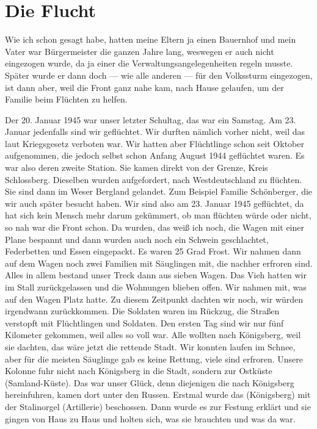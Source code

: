 \documentclass[12pt, twoside]{book}
\begin{document}
\chapter{Die Flucht}

Wie ich schon gesagt habe, hatten meine Eltern ja einen Bauernhof und mein Vater war Bürgermeister die ganzen Jahre lang, weswegen er auch nicht eingezogen wurde, da ja einer die Verwaltungsangelegenheiten regeln musste.
Später wurde er dann doch --- wie alle anderen --- für den Volkssturm eingezogen, ist dann aber, weil die Front ganz nahe kam, nach Hause gelaufen, um der Familie beim Flüchten zu helfen. 

Der 20. Januar 1945 war unser letzter Schultag, das war ein Samstag. Am 23. Januar jedenfalls sind wir geflüchtet. Wir durften nämlich vorher nicht, weil das laut Kriegsgesetz verboten war.
Wir hatten aber Flüchtlinge schon seit Oktober aufgenommen, die jedoch selbst schon Anfang August 1944 geflüchtet waren. Es war also deren zweite Station. Sie kamen direkt von der Grenze, Kreis Schlossberg.
Dieselben wurden aufgefordert, nach Westdeutschland zu flüchten. Sie sind dann im Weser Bergland gelandet. Zum Beispiel Familie Schönberger, die wir auch später besucht haben. Wir sind also am 23. Januar 1945
geflüchtet, da hat sich kein Mensch mehr darum gekümmert, ob man flüchten würde oder nicht, so nah war die Front schon. Da wurden, das weiß ich noch, die Wagen mit einer Plane bespannt und dann wurden 
auch noch ein Schwein geschlachtet, Federbetten und Essen eingepackt. Es waren 25 Grad Frost. Wir nahmen dann auf dem Wagen noch zwei Familien mit Säuglingen mit, die nachher erfroren sind.
Alles in allem bestand unser Treck dann aus sieben Wagen. Das Vieh hatten wir im Stall zurückgelassen und die Wohnungen blieben offen. Wir nahmen mit, was auf den Wagen Platz hatte. Zu diesem Zeitpunkt dachten
wir noch, wir würden irgendwann zurückkommen. Die Soldaten waren im Rückzug, die Straßen verstopft mit Flüchtlingen und Soldaten. Den ersten Tag sind wir nur fünf Kilometer gekommen, weil alles so voll
war. Alle wollten nach Königsberg, weil sie dachten, das wäre jetzt die rettende Stadt.
Wir konnten laufen im Schnee, aber für die meisten Säuglinge gab es keine Rettung, viele sind erfroren. Unsere Kolonne fuhr nicht nach Königsberg in die Stadt, sondern zur Ostküste (Samland-Küste).
Das war unser Glück, denn diejenigen die nach Königsberg hereinfuhren, kamen dort unter den Russen. Erstmal wurde das (Königsberg) mit der Stalinorgel (Artillerie) beschossen. Dann wurde es zur Festung erklärt und sie gingen 
von Haus zu Haus und holten sich, was sie brauchten und was da war.
\end{document}
